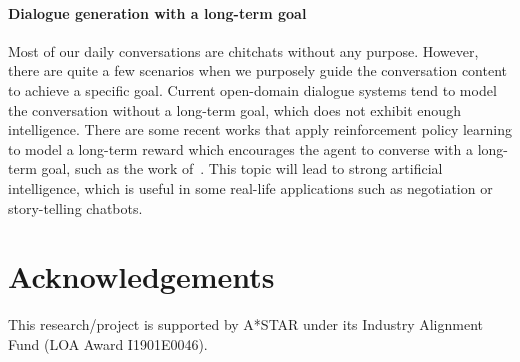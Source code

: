 \paragraph*{Dialogue generation with a long-term goal} Most of our daily conversations are chitchats without any purpose. However, there are quite a few scenarios when we purposely guide the conversation content to achieve a specific goal. Current open-domain dialogue systems tend to model the conversation without a long-term goal, which does not exhibit enough intelligence. There are some recent works that apply reinforcement policy learning to model a long-term reward 
which encourages the agent to converse with a long-term goal, such as the work of~. This topic will lead to strong artificial intelligence, which is useful in some real-life applications such as negotiation or story-telling chatbots.
\section*{Acknowledgements}
This research/project is supported by A*STAR under its Industry Alignment Fund (LOA Award I1901E0046).
   
  
